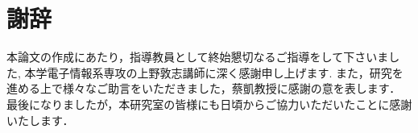 \documentclass[\homedir/main.tex]{subfiles}
\begin{document}
\chapter*{謝辞}\label{chap:acknowledgment}
本論文の作成にあたり，指導教員として終始懇切なるご指導をして下さいました,
本学電子情報系専攻の上野敦志講師に深く感謝申し上げます.
また，研究を進める上で様々なご助言をいただきました，蔡凱教授に感謝の意を表します．\\
最後になりましたが，本研究室の皆様にも日頃からご協力いただいたことに感謝いたします．
\end{document}
